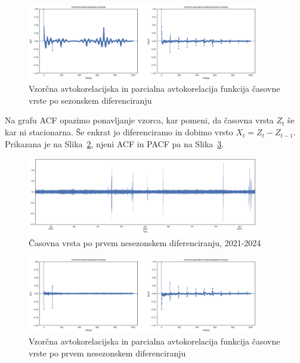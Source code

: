 \documentclass[a4paper, 11pt]{article}
\begin{document}
\begin{figure}[h!]
    \centering
    \caption{Vzorčna avtokorelacijska in parcialna avtokorelacija funkcija časovne vrste po sezonskem diferenciranju}\par\medskip
    \label{fig:ts_diff_acf_pacf}
    \includegraphics[width=0.9\textwidth]{ts_diff_acf_pacf.png}
\end{figure}

\noindent Na grafu ACF opazimo ponavljanje vzorca, kar pomeni, da časovna vrsta $Z_t$ še kar ni stacionarna. 
Še enkrat jo diferenciramo in dobimo vrsto $X_t = Z_t - Z_{t-1}$. 
Prikazana je na Slika~\ref{fig:ts_diff_2}, njeni ACF in PACF pa na Slika~\ref{fig:ts_diff_2_acf_pacf}.

\begin{figure}[h!]
    \centering
    \caption{Časovna vrsta po prvem nesezonskem diferenciranju, 2021-2024}\par\medskip
    \label{fig:ts_diff_2}
    \includegraphics[width=0.9\textwidth]{ts_diff_2.png}
\end{figure}

\begin{figure}[h!]
    \centering
    \caption{Vzorčna avtokorelacijska in parcialna avtokorelacija funkcija časovne vrste po prvem nesezonskem diferenciranju}\par\medskip
    \label{fig:ts_diff_2_acf_pacf}
    \includegraphics[width=0.9\textwidth]{ts_diff_2_acf_pacf.png}
\end{figure}
\end{document}
